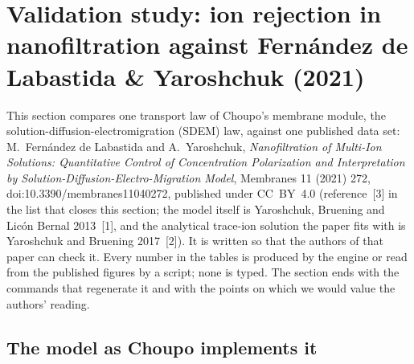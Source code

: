 
\clearpage
\section*{Validation study: ion rejection in nanofiltration against Fern\'andez de Labastida \& Yaroshchuk (2021)}

This section compares one transport law of Choupo's membrane module, the
solution-diffusion-electromigration (SDEM) law, against one published data
set: M.~Fern\'andez de Labastida and A.~Yaroshchuk, \emph{Nanofiltration of
Multi-Ion Solutions: Quantitative Control of Concentration Polarization and
Interpretation by Solution-Diffusion-Electro-Migration Model}, Membranes 11
(2021) 272, doi:10.3390/membranes11040272, published under CC~BY~4.0
(reference~[3] in the list that closes this section; the model itself is
Yaroshchuk, Bruening and Lic\'on Bernal 2013~[1], and the analytical
trace-ion solution the paper fits with is Yaroshchuk and Bruening 2017~[2]).
It is written so that the authors of that paper can check it.  Every number in the
tables is produced by the engine or read from the published figures by a
script; none is typed.  The section ends with the commands that regenerate
it and with the points on which we would value the authors' reading.

\subsection*{The model as Choupo implements it}

